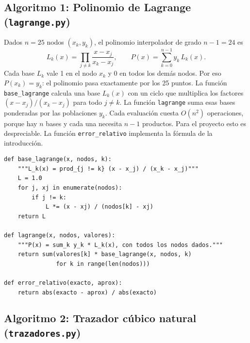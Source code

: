 \documentclass[11pt]{article}
\begin{document}
\subsection{Algoritmo 1: Polinomio de Lagrange (\texttt{lagrange.py})}
Dados $n=25$ nodos $(x_k, y_k)$, el polinomio interpolador de grado $n-1=24$ es
\[
L_k(x) = \prod_{j \neq k} \frac{x - x_j}{x_k - x_j}, \qquad
P(x) = \sum_{k=0}^{n-1} y_k\, L_k(x).
\]
Cada base $L_k$ vale 1 en el nodo $x_k$ y 0 en todos los demás nodos. Por eso
$P(x_k) = y_k$: el polinomio pasa exactamente por los 25 puntos. La función
\texttt{base\_lagrange} calcula una base $L_k(x)$ con un ciclo que multiplica los
factores $(x - x_j)/(x_k - x_j)$ para todo $j \neq k$. La función \texttt{lagrange}
suma esas bases ponderadas por las poblaciones $y_k$. Cada evaluación cuesta
$O(n^2)$ operaciones, porque hay $n$ bases y cada una necesita $n-1$ productos.
Para el proyecto esto es despreciable. La función \texttt{error\_relativo}
implementa la fórmula de la introducción.

\begin{lstlisting}
def base_lagrange(x, nodos, k):
    """L_k(x) = prod_{j != k} (x - x_j) / (x_k - x_j)"""
    L = 1.0
    for j, xj in enumerate(nodos):
        if j != k:
            L *= (x - xj) / (nodos[k] - xj)
    return L

def lagrange(x, nodos, valores):
    """P(x) = sum_k y_k * L_k(x), con todos los nodos dados."""
    return sum(valores[k] * base_lagrange(x, nodos, k)
               for k in range(len(nodos)))

def error_relativo(exacto, aprox):
    return abs(exacto - aprox) / abs(exacto)
\end{lstlisting}

\subsection{Algoritmo 2: Trazador cúbico natural (\texttt{trazadores.py})}
\end{document}
